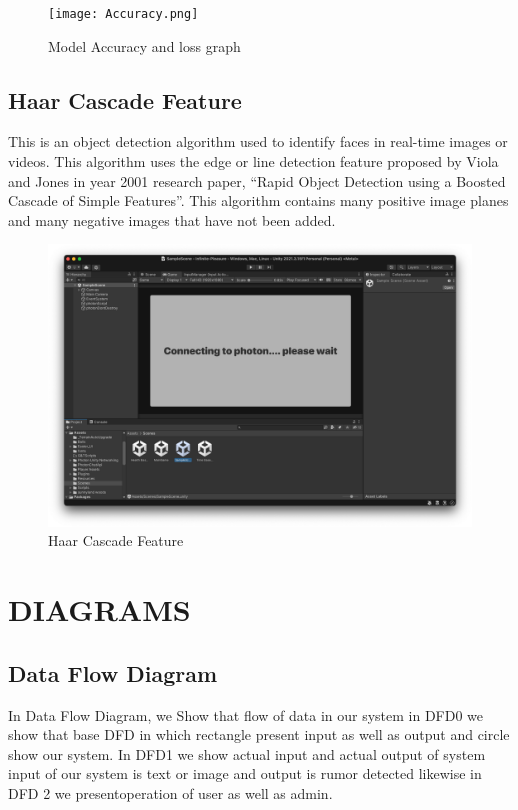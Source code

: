\documentclass[12pt]{report}
\begin{document}
\begin{figure}[h]
\centering
\texttt{[image: Accuracy.png]}
\caption{Model Accuracy and loss graph}
\label{Model Accuracy and loss graph}
\end{figure}

\subsection{ Haar Cascade Feature}
\hspace{1.7cm}This is an object detection algorithm used to identify faces in real-time images or videos. 
This algorithm uses the edge or line detection feature proposed by Viola and Jones in year 
2001 research paper, “Rapid Object Detection using a Boosted Cascade of Simple 
Features”. This algorithm contains many positive image planes and many negative images 
that have not been added.
\vspace{1.5cm}
\begin{figure}[h]
\centering
\includegraphics[scale=0.6]{Haar.png}
\caption{Haar Cascade Feature}
\label{Haar Cascade Feature}
\end{figure}
\clearpage

\vspace{4cm}
\raggedright
\centering
\section{DIAGRAMS}
\justifying
\setlength{\parindent}{4em}
\setlength{\parskip}{0.5em}
\renewcommand{\baselinestretch}{1.5}
\normalsize
\subsection{Data Flow Diagram}
In Data Flow Diagram, we Show that flow of data in our system in DFD0 we show that 
base DFD in which rectangle present input as well as output and circle show our system. 
In DFD1 we show actual input and actual output of system input of our system is text or 
image and output is rumor detected likewise in DFD 2 we presentoperation of user as well
as admin.
\end{document}
